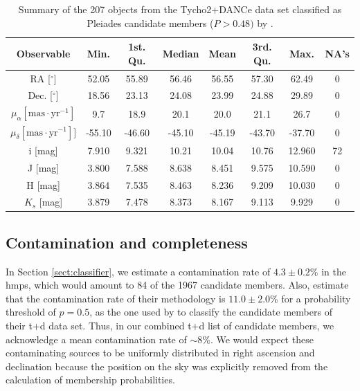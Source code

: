 \begin{table}[ht!]
\caption{Summary of the 207 objects from the Tycho2+DANCe data set classified as Pleiades candidate members ($P>0.48)$ by \citet{Bouy2015}.}
\begin{center}
\begin{tabular}{|c|c|c|c|c|c|c|c|}
\hline
Observable & Min. & 1st. Qu. & Median & Mean & 3rd. Qu. & Max. & NA's \\
\hline
\hline
RA [$^\circ$]                                 				            &  52.05&55.89 & 56.46 &56.55  &57.30   &  62.49  & 0\\
Dec. [$^\circ$]                       					           &  18.56&23.13  & 24.08& 23.99  &24.88  & 29.89 &0\\
$\mu_{\alpha} [\mathrm{mas}\cdot \mathrm{yr}^{-1}]$   &      9.7 &18.9   & 20.1  &    20.0 &  21.1   &  26.7&0\\
$\mu_{\delta} [\mathrm{mas}\cdot \mathrm{yr}^{-1}]]$   &  -55.10&-46.60&-45.10&-45.19 &-43.70  & -37.70&0\\
i [mag]								            &   7.910&9.321 & 10.21&  10.04 &   10.76& 12.960&   72\\
J [mag]          								    &   3.800& 7.588& 8.638& 8.451 & 9.575  &10.590&      0\\
H [mag]        								    &   3.864& 7.535& 8.463& 8.236 & 9.209  & 10.030&      0 \\
$K_s$ [mag]  							            &   3.879&7.478 & 8.373& 8.167  &  9.113 &  9.929&    0\\
\hline
\end{tabular}
\end{center}
\label{tab:tycho2}
\end{table}%

\subsection{Contamination and completeness}
\label{sect:TDContamination}
In Section \ref{sect:classifier}, we estimate a contamination rate of $4.3\pm0.2$\% in the \gls{hmps}, which
would amount to 84 of the 1967 candidate members. Also, \citet{Sarro2014} estimate that the contamination rate of their methodology is $11.0\pm2.0$\% for a probability threshold of $p=0.5$, as the one used by \citet{Bouy2015} to classify the candidate members of their \gls{t+d} data set.  Thus, in our combined \gls{t+d} list of candidate members, we acknowledge a mean contamination rate of $\sim 8\%$. We would expect these contaminating sources to be uniformly distributed in right ascension and declination because the position on the sky was explicitly removed from the calculation of membership probabilities.


